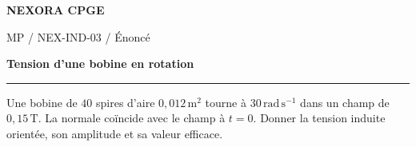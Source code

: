 \documentclass[11pt,a4paper]{article}
\begin{document}
{\small\bfseries\color{nexorablue} NEXORA CPGE}\par
{\small MP / NEX-IND-03 / Énoncé}\par
{\LARGE\bfseries Tension d’une bobine en rotation}\par
\vspace{0.25em}\hrule\vspace{0.6em}

Une bobine de $40$ spires d’aire $0{,}012\,\mathrm{m^2}$ tourne à $30\,\mathrm{rad\,s^{-1}}$ dans un champ de $0{,}15\,\mathrm T$. La normale coïncide avec le champ à $t=0$. Donner la tension induite orientée, son amplitude et sa valeur efficace.
\end{document}
